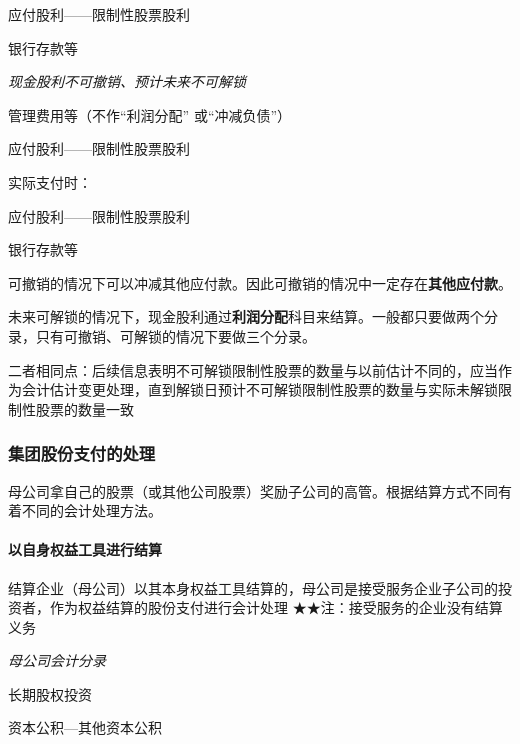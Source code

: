 \documentclass[UTF8,12pt]{ctexart}
\newenvironment{Dr}{%
	\begin{list}{}%
		{
			\setlength{\leftmargin}{2em}
			\setlength{\labelwidth}{2em}
			\setlength{\labelsep}{0pt}
			\setlength{\itemindent}{0pt}
			\setlength{\listparindent}{0pt}
			\setlength{\parsep}{0pt}
			\setlength{\topsep}{0pt}
		}
		\item[\textbf{借：}]
	}{%
	\end{list}
}
\newenvironment{Cr}{%
	\begin{list}{}%
		{
			\setlength{\leftmargin}{2em}
			\setlength{\labelwidth}{2em}
			\setlength{\labelsep}{0pt}
			\setlength{\itemindent}{0pt}
			\setlength{\listparindent}{0pt}
			\setlength{\parsep}{0pt}
			\setlength{\topsep}{0pt}
		}
		\item[\textbf{贷：}]
	}{%
	\end{list}
}
\numberwithin{equation}{section} %
\numberwithin{figure}{section}
\numberwithin{table}{section}
\begin{document}
	\begin{Dr}
		应付股利——限制性股票股利
	\end{Dr}
	\begin{Cr}
		银行存款等
	\end{Cr}
	
	\textit{现金股利不可撤销、预计未来不可解锁}
	
	\begin{Dr}
		管理费用等（不作“利润分配” 或“冲减负债”）
	\end{Dr}
	\begin{Cr}
		应付股利——限制性股票股利
	\end{Cr}
	
	实际支付时：
	
	\begin{Dr}
		应付股利——限制性股票股利
	\end{Dr}
	\begin{Cr}
		银行存款等
	\end{Cr}
	
	可撤销的情况下可以冲减其他应付款。因此可撤销的情况中一定存在\textbf{其他应付款}。
	
	未来可解锁的情况下，现金股利通过\textbf{利润分配}科目来结算。一般都只要做两个分录，只有可撤销、可解锁的情况下要做三个分录。
	
	二者相同点：后续信息表明不可解锁限制性股票的数量与以前估计不同的，应当作为会计估计变更处理，直到解锁日预计不可解锁限制性股票的数量与实际未解锁限制性股票的数量一致
	
	\subsubsection{集团股份支付的处理}
	母公司拿自己的股票（或其他公司股票）奖励子公司的高管。根据结算方式不同有着不同的会计处理方法。
	
	\paragraph{以自身权益工具进行结算}
	结算企业（母公司）以其本身权益工具结算的，母公司是接受服务企业子公司的投资者，作为权益结算的股份支付进行会计处理
	★★注：接受服务的企业没有结算义务
	
	\textit{母公司会计分录}
	
	\begin{Dr}
		长期股权投资
	\end{Dr}
	\begin{Cr}
		资本公积—其他资本公积
	\end{Cr}
	
\end{document}
